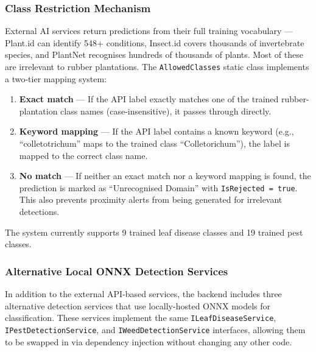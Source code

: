 \subsubsection{Class Restriction Mechanism}

External AI services return predictions from their full training vocabulary --- Plant.id can identify 548+ conditions, Insect.id covers thousands of invertebrate species, and PlantNet recognises hundreds of thousands of plants. Most of these are irrelevant to rubber plantations. The \texttt{AllowedClasses} static class implements a two-tier mapping system:

\begin{enumerate}
    \item \textbf{Exact match} --- If the API label exactly matches one of the trained rubber-plantation class names (case-insensitive), it passes through directly.
    \item \textbf{Keyword mapping} --- If the API label contains a known keyword (e.g., ``colletotrichum'' maps to the trained class ``Colletorichum''), the label is mapped to the correct class name.
    \item \textbf{No match} --- If neither an exact match nor a keyword mapping is found, the prediction is marked as ``Unrecognised Domain'' with \texttt{IsRejected = true}. This also prevents proximity alerts from being generated for irrelevant detections.
\end{enumerate}

The system currently supports 9 trained leaf disease classes and 19 trained pest classes.

\subsubsection{Alternative Local ONNX Detection Services}

In addition to the external API-based services, the backend includes three alternative detection services that use locally-hosted ONNX models for classification. These services implement the same \texttt{ILeafDiseaseService}, \texttt{IPestDetectionService}, and \texttt{IWeedDetectionService} interfaces, allowing them to be swapped in via dependency injection without changing any other code.

